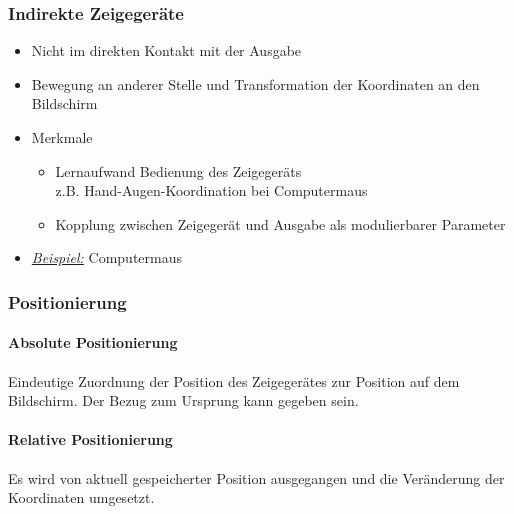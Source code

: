 \documentclass
[
	8pt,		%
	ngerman,	%
	a4paper,	%
	landscape,	%
	final		%
]{extarticle}
\newcommand{\example}{\textit{\underline{Beispiel:} }}
\begin{document}
\begin{multicols*}{4}
	\subsubsection{Indirekte Zeigegeräte}
	\begin{itemize}
		\item Nicht im direkten Kontakt mit der Ausgabe
		\item Bewegung an anderer Stelle und Transformation der Koordinaten an
		      den Bildschirm
		\item Merkmale
		      \begin{itemize}[nolistsep]
			      \item Lernaufwand Bedienung des Zeigegeräts \\
			            z.B. Hand-Augen-Koordination bei Computermaus
			      \item Kopplung zwischen Zeigegerät und Ausgabe als
			            modulierbarer Parameter
		      \end{itemize}
		\item \example Computermaus
	\end{itemize}
	\subsubsection{Positionierung}
	\paragraph{Absolute Positionierung} Eindeutige Zuordnung der Position des
	Zeigegerätes zur Position auf dem Bildschirm. Der Bezug zum Ursprung kann
	gegeben sein.
	\paragraph{Relative Positionierung} Es wird von aktuell gespeicherter
	Position ausgegangen und die Veränderung der Koordinaten umgesetzt.

\end{multicols*}
\end{document}
